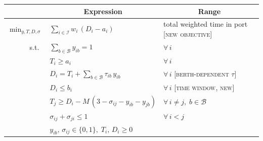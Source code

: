 \documentclass[11pt]{article}
\begin{document}
\vspace{0.4em}

\begin{center}
\renewcommand{\arraystretch}{1.35}
\begin{tabular}{@{}r l l@{}}
\toprule
& \multicolumn{1}{c}{Expression} & \multicolumn{1}{c}{Range} \\
\midrule
$\displaystyle\min_{y,T,D,\sigma}$ &
$\displaystyle\sum_{i\in\mathcal{I}} w_i\,(D_i - a_i)$ &
total weighted time in port \textsc{[new objective]} \\
\midrule
s.t.\ &
$\displaystyle\sum_{b\in\mathcal{B}} y_{ib} = 1$ &
$\forall\, i$ \\

&
$T_i \geq a_i$ &
$\forall\, i$ \\

&
$D_i = T_i + \displaystyle\sum_{b\in\mathcal{B}} \tau_{ib}\, y_{ib}$ &
$\forall\, i$ \quad\textsc{[berth-dependent $\tau$]} \\

&
$D_i \leq b_i$ &
$\forall\, i$ \quad\textsc{[time window, new]} \\

&
$T_j \geq D_i - M\,(3 - \sigma_{ij} - y_{ib} - y_{jb})$ &
$\forall\, i\neq j,\; b\in\mathcal{B}$ \\

&
$\sigma_{ij} + \sigma_{ji} \leq 1$ &
$\forall\, i<j$ \\

&
$y_{ib},\,\sigma_{ij}\in\{0,1\},\; T_i,\,D_i\geq 0$ &
\\
\bottomrule
\end{tabular}
\end{center}

\vspace{0.6em}
\end{document}
